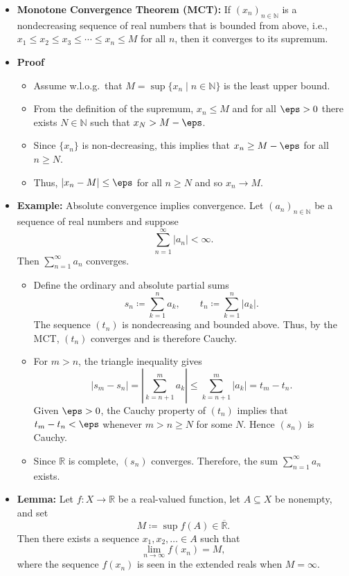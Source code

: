 \documentclass[11pt,twoside]{report}
\newcommand{\bbN}{{\mathbb{N}}}
\newcommand{\bbR}{{\mathbb{R}}}
\begin{document}
\begin{itemize}
\begin{itemize}
\item \textbf{Monotone Convergence Theorem (MCT):} If $(x_n)_{n \in \bbN} $ is a nondecreasing sequence of real numbers that is bounded from above, i.e., $x_1 \le x_2 \le x_3 \le \cdots \le x_n \le M$ for all $n$, then it converges to its supremum. 
 

\item \textbf{Proof} 
\begin{itemize}
\item Assume w.l.o.g.\ that $M = \sup \{x_n \mid n \in \bbN \}$ is the least upper bound.

\item From the definition of the supremum, $x_n \le M$ and for all $\eps > 0$ there exists $N \in \bbN$ such that $x_N > M -\eps$. 

\item Since $\{x_n\}$ is non-decreasing, this implies that $x_n \ge M -\eps$ for all $n \ge N$. 

\item Thus, $|x_n - M| \le \eps$ for all $n \ge N$ and so $x_n \to M$. 


\end{itemize}


\item \textbf{Example:} Absolute convergence implies convergence.  Let $(a_n)_{n\in\bbN}$ be a sequence of real numbers and suppose
\[
\sum_{n=1}^{\infty}|a_n|<\infty.
\]
Then $\sum_{n=1}^{\infty}a_n$ converges.
\begin{itemize}
\item Define the ordinary and absolute partial sums
\[
s_n \coloneqq \sum_{k=1}^{n}a_k,
\qquad
t_n \coloneqq \sum_{k=1}^{n}|a_k|.
\]
The sequence $(t_n)$ is nondecreasing and bounded above.  Thus, by the MCT, $(t_n)$ converges and is therefore Cauchy.

\item For $m>n$, the triangle inequality gives
\[
|s_m-s_n|
= \left|\sum_{k=n+1}^{m}a_k\right|
\leq \sum_{k=n+1}^{m}|a_k|
= t_m-t_n.
\]
Given $\eps>0$, the Cauchy property of $(t_n)$ implies that $t_m-t_n<\eps$ whenever $m>n\geq N$ for some $N$.  Hence $(s_n)$ is Cauchy.

\item Since $\bbR$ is complete, $(s_n)$ converges.  Therefore, the sum $\sum_{n=1}^{\infty}a_n$ exists.
\end{itemize}


\item \textbf{Lemma:} Let $f\colon X\to\bbR$ be a real-valued function, let $A\subseteq X$ be nonempty, and set
\[
M\coloneqq \sup f(A)\in\overline{\bbR}.
\]
Then there exists a sequence $x_1,x_2,\ldots\in A$ such that
\[
\lim_{n\to\infty}f(x_n)=M,
\]
where the sequence $f(x_n)$ is seen in the extended reals when $M=\infty$.


\end{itemize}
\end{itemize}
\end{document}

